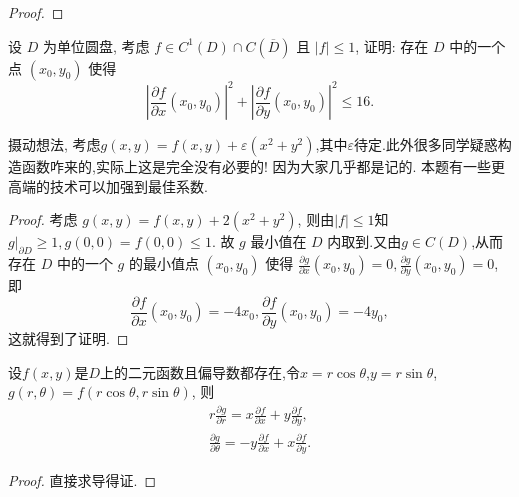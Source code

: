 \documentclass[../../main.tex]{subfiles}%
\begin{document}
\begin{proof}
\end{proof}

\begin{example}
设 \( D \) 为单位圆盘, 考虑 \( f \in C^1(D) \cap C(\overline{D}) \) 且 \( |f| \leqslant 1 \), 证明: 存在 \( D \) 中的一个点 \( (x_0, y_0) \) 使得
\[
\left| \frac{\partial f}{\partial x}(x_0, y_0) \right|^2 + \left| \frac{\partial f}{\partial y}(x_0, y_0) \right|^2 \leqslant 16 .
\]
\end{example}
\begin{note}
摄动想法, 考虑$g(x,y)=f(x,y)+\varepsilon (x^2+y^2)$,其中$\varepsilon$待定.此外很多同学疑惑构造函数咋来的,实际上这是完全没有必要的! 因为大家几乎都是记的. 本题有一些更高端的技术可以加强到最佳系数.
\end{note}
\begin{proof}

考虑 \( g(x, y) = f(x, y) + 2(x^2 + y^2) \), 则由$|f|\leqslant 1$知\( g|_{\partial D} \geqslant 1, g(0, 0)=f(0,0) \leqslant 1 \). 故 \( g \) 最小值在 \( D \) 内取到.又由$g\in C(D)$,从而存在 \( D \) 中的一个 \( g \) 的最小值点 \( (x_0, y_0) \) 使得 \( \frac{\partial g}{\partial x}(x_0, y_0) = 0, \frac{\partial g}{\partial y}(x_0, y_0) = 0 \), 即
\[
\frac{\partial f}{\partial x}(x_0, y_0) = -4x_0, \frac{\partial f}{\partial y}(x_0, y_0) = -4y_0,
\]
这就得到了证明.

\end{proof}

\begin{proposition}\label{proposition:极坐标变换偏导数相关结论}
设$f(x,y)$是$D$上的二元函数且偏导数都存在,令$x=r\cos \theta$,$y=r\sin \theta$,\( g(r, \theta) = f(r \cos \theta, r \sin \theta) \), 则
\begin{gather*}
r \frac{\partial g}{\partial r} = x \frac{\partial f}{\partial x} + y \frac{\partial f}{\partial y},
\\
\frac{\partial g}{\partial \theta} = -y \frac{\partial f}{\partial x} + x \frac{\partial f}{\partial y}.
\end{gather*}
\end{proposition}
\begin{proof}

直接求导得证.

\end{proof}
\end{document}

